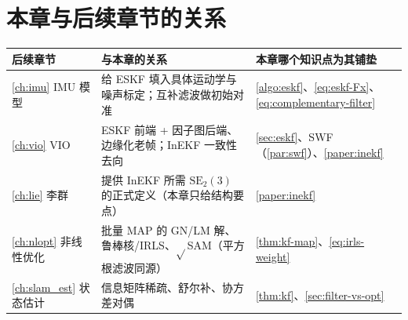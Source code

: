 \section*{本章与后续章节的关系}
\begin{table}[H]\centering\small
\begin{tabularx}{\linewidth}{lLL}
\toprule
后续章节 & 与本章的关系 & 本章哪个知识点为其铺垫 \\
\midrule
\cref{ch:imu} IMU 模型 & 给 ESKF 填入具体运动学与噪声标定；互补滤波做初始对准 & \cref{algo:eskf}、\cref{eq:eskf-Fx}、\cref{eq:complementary-filter} \\
\cref{ch:vio} VIO & ESKF 前端 + 因子图后端、边缘化老帧；InEKF 一致性去向 & \cref{sec:eskf}、SWF（\cref{par:swf}）、\cref{paper:inekf} \\
\cref{ch:lie} 李群 & 提供 InEKF 所需 $\mathrm{SE}_2(3)$ 的正式定义（本章只给结构要点） & \cref{paper:inekf} \\
\cref{ch:nlopt} 非线性优化 & 批量 MAP 的 GN/LM 解、鲁棒核/IRLS、$\sqrt{}$SAM（平方根滤波同源） & \cref{thm:kf-map}、\cref{eq:irls-weight} \\
\cref{ch:slam_est} 状态估计 & 信息矩阵稀疏、舒尔补、协方差对偶 & \cref{thm:kf}、\cref{sec:filter-vs-opt} \\
\bottomrule
\end{tabularx}
\end{table}

